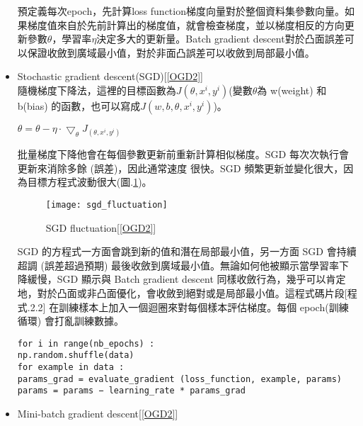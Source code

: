 \begin{itemize}
\newpage
 預定義每次epoch，先計算loss function梯度向量對於整個資料集參數向量。如果梯度值來自於先前計算出的梯度值，就會檢查梯度，並以梯度相反的方向更新參數$\theta$，學習率$\eta$決定多大的更新量。Batch gradient descent對於凸面誤差可以保證收斂到廣域最小值，對於非面凸誤差可以收斂到局部最小值。
\item Stochastic gradient descent(SGD)[\ref{OGD2}]\\
隨機梯度下降法，這裡的目標函數為$J(\theta, x^i, y^i)$(變數$\theta$為 w(weight) 和 b(bias) 的函數，也可以寫成$J(w,b,\theta, x^i, y^i)$)。\\
\begin{center}
$\theta=\theta-\eta\cdot\bigtriangledown_{\theta}J_{(\theta, x^i, y^i)}$
\end{center}
批量梯度下降他會在每個參數更新前重新計算相似梯度。SGD 每次次執行會更新來消除多餘 (誤差)，因此通常速度 很快。SGD 頻繁更新並變化很大，因為目標方程式波動很大(圖.\ref{sgd_fluctuation})。\\

\begin{figure}
\begin{center}
\texttt{[image: sgd\_fluctuation]}
\caption{\Large SGD fluctuation[\ref{OGD2}]}
\label{sgd_fluctuation}
\end{center}
\end{figure}
 SGD 的方程式一方面會跳到新的值和潛在局部最小值，另一方面 SGD 會持續超調 (誤差超過預期) 最後收斂到廣域最小值。無論如何他被顯示當學習率下降緩慢，SGD 顯示與 Batch gradient descent 同樣收斂行為，幾乎可以肯定地，對於凸面或非凸面優化，會收斂到絕對或是局部最小值。這程式碼片段[程式.2.2] 在訓練樣本上加入一個迴圈來對每個樣本評估梯度。每個 epoch(訓練循環) 會打亂訓練數據。
\label{code Stochastic gradient descrnt code}
\begin{lstlisting}[caption=\Large Stochastic gradient descrnt ]
for i in range(nb_epochs) :
np.random.shuffle(data)
for example in data :
params_grad = evaluate_gradient (loss_function, example, params)
params = params − learning_rate * params_grad
\end{lstlisting}
\item Mini-batch gradient descent[\ref{OGD2}]


\end{itemize}
